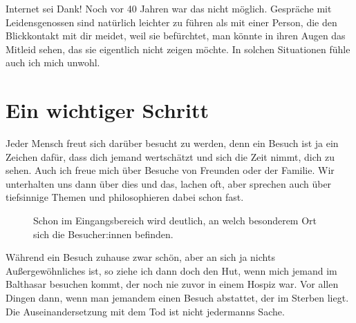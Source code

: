 \documentclass[fontsize=14pt,a4paper,headinclude,DIV=calc,automark]{scrbook}
\begin{document}
Internet sei Dank! Noch vor 40 Jahren war das nicht möglich. Gespräche mit Leidensgenossen sind natürlich leichter zu führen als mit einer Person, die den Blickkontakt mit dir meidet, weil sie befürchtet, man könnte in ihren Augen das Mitleid sehen, das sie eigentlich nicht zeigen möchte. In solchen Situationen fühle auch ich mich unwohl.

\section{Ein wichtiger Schritt}

Jeder Mensch freut sich darüber besucht zu werden, denn ein Besuch ist ja ein Zeichen dafür, dass dich jemand wertschätzt und sich die Zeit nimmt, dich zu sehen. Auch ich freue mich über Besuche von Freunden oder der Familie. Wir unterhalten uns dann über dies und das, lachen oft, aber sprechen auch über tiefsinnige Themen und philosophieren dabei schon fast.

\setlength{\fboxsep}{0pt}    %
\setlength{\fboxrule}{0.2pt} %
\begin{figure}[ht]
    \raggedright
    \caption{Schon im Eingangsbereich wird deutlich, an welch besonderem Ort sich die Besucher:innen befinden.}
    \label{fig:leben_lachen_sterben_trauern}
\end{figure}

Während ein Besuch zuhause zwar schön, aber an sich ja nichts Außergewöhnliches ist, so ziehe ich dann doch den Hut, wenn mich jemand im Balthasar besuchen kommt, der noch nie zuvor in einem Hospiz war. Vor allen Dingen dann, wenn man jemandem einen Besuch abstattet, der im Sterben liegt. Die Auseinandersetzung mit dem Tod ist nicht jedermanns Sache.
\end{document}
